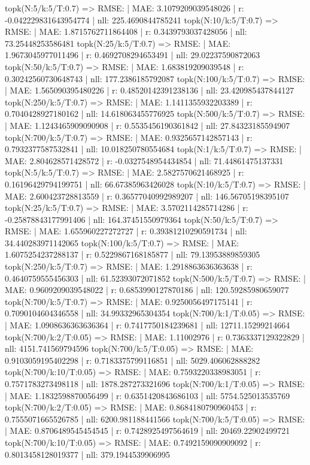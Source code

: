 topk(N:5/k:5/T:0.7) => RMSE: | MAE: 3.1079209039548026 | r: -0.042229831643954774 | nll: 225.4690844785241
topk(N:10/k:5/T:0.7) => RMSE: | MAE: 1.8715762711864408 | r: 0.3439793037428056 | nll: 73.25448253586481
topk(N:25/k:5/T:0.7) => RMSE: | MAE: 1.9673045977011496 | r: 0.4692708294653491 | nll: 29.02237590872063
topk(N:50/k:5/T:0.7) => RMSE: | MAE: 1.683819209039548 | r: 0.30242560730648743 | nll: 177.2386185792087
topk(N:100/k:5/T:0.7) => RMSE: | MAE: 1.565090395480226 | r: 0.48520142391238136 | nll: 23.420985437844127
topk(N:250/k:5/T:0.7) => RMSE: | MAE: 1.1411355932203389 | r: 0.7040428927180162 | nll: 14.618063455776925
topk(N:500/k:5/T:0.7) => RMSE: | MAE: 1.1243465909090908 | r: 0.5535456190361842 | nll: 27.84323185594907
topk(N:700/k:5/T:0.7) => RMSE: | MAE: 0.9325657142857143 | r: 0.7932377587532841 | nll: 10.018250780554684
topk(N:1/k:5/T:0.7) => RMSE: | MAE: 2.804628571428572 | r: -0.0327548954434854 | nll: 71.44861475137331
topk(N:5/k:5/T:0.7) => RMSE: | MAE: 2.5827570621468925 | r: 0.16196429794199751 | nll: 66.67385963426028
topk(N:10/k:5/T:0.7) => RMSE: | MAE: 2.600423728813559 | r: 0.36577040992989207 | nll: 146.56705198395107
topk(N:25/k:5/T:0.7) => RMSE: | MAE: 3.5702114285714286 | r: -0.25878843177991406 | nll: 164.37451550979364
topk(N:50/k:5/T:0.7) => RMSE: | MAE: 1.655960227272727 | r: 0.39381210290591734 | nll: 34.440283971142065
topk(N:100/k:5/T:0.7) => RMSE: | MAE: 1.6075254237288137 | r: 0.5229867168185877 | nll: 79.13953889859305
topk(N:250/k:5/T:0.7) => RMSE: | MAE: 1.2918863636363638 | r: 0.4640759555456303 | nll: 61.52393072071852
topk(N:500/k:5/T:0.7) => RMSE: | MAE: 0.9609209039548022 | r: 0.6853990127870186 | nll: 120.59285980659077
topk(N:700/k:5/T:0.7) => RMSE: | MAE: 0.9250056497175141 | r: 0.7090104604346558 | nll: 34.99332965304354
topk(N:700/k:1/T:0.05) => RMSE: | MAE: 1.0908636363636364 | r: 0.7417750184239681 | nll: 12711.15299214664
topk(N:700/k:2/T:0.05) => RMSE: | MAE: 1.11002976 | r: 0.7363337129322829 | nll: 4151.741569794596
topk(N:700/k:5/T:0.05) => RMSE: | MAE: 0.9103059195402298 | r: 0.7183375799116851 | nll: 5029.406062888282
topk(N:700/k:10/T:0.05) => RMSE: | MAE: 0.7593220338983051 | r: 0.7571783273498118 | nll: 1878.287273321696
topk(N:700/k:1/T:0.05) => RMSE: | MAE: 1.1832598870056499 | r: 0.6351420843686103 | nll: 5754.525013535769
topk(N:700/k:2/T:0.05) => RMSE: | MAE: 0.8684180790960453 | r: 0.7555071665526785 | nll: 6200.981188441566
topk(N:700/k:5/T:0.05) => RMSE: | MAE: 0.8706489545454545 | r: 0.7428925497564619 | nll: 20469.22902499721
topk(N:700/k:10/T:0.05) => RMSE: | MAE: 0.7492159090909092 | r: 0.8013458128019377 | nll: 379.1944539906995

